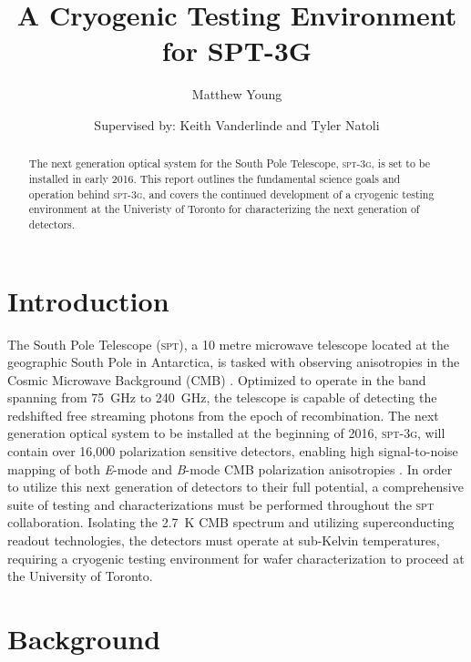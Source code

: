\documentclass[preprint]{aastex}
\begin{document}
\title{A Cryogenic Testing Environment for SPT-3G}
\author{Matthew Young}
\author{Supervised by: Keith Vanderlinde and Tyler Natoli}

\begin{abstract}
The next generation optical system for the South Pole Telescope, \textsc{spt-3g}, is set to be installed in early 2016.  This report outlines the fundamental science goals and operation behind \textsc{spt-3g}, and covers the continued development of a cryogenic testing environment at the Univeristy of Toronto for characterizing the next generation of detectors.  
\end{abstract}



\section{Introduction}

The South Pole Telescope (\textsc{spt}), a 10 metre microwave telescope located at the geographic South Pole in Antarctica, is tasked with observing anisotropies in the Cosmic Microwave Background (CMB) \citep{spt_collaboration_south_2004}.  Optimized to operate in the band spanning from 75~GHz to 240~GHz, the telescope is capable of detecting the redshifted free streaming photons from the epoch of recombination.  The next generation optical system to be installed at the beginning of 2016, \textsc{spt-3g}, will contain over 16,000 polarization sensitive detectors, enabling high signal-to-noise mapping of both \textit{E}-mode and \textit{B}-mode CMB polarization anisotropies \citep{benson_spt-3g:_2014}.  In order to utilize this next generation of detectors to their full potential, a comprehensive suite of testing and characterizations must be performed throughout the \textsc{spt} collaboration.  Isolating the 2.7~K CMB spectrum and utilizing superconducting readout technologies, the detectors must operate at sub-Kelvin temperatures, requiring a cryogenic testing environment for wafer characterization to proceed at the University of Toronto.

\section{Background}
\end{document}
